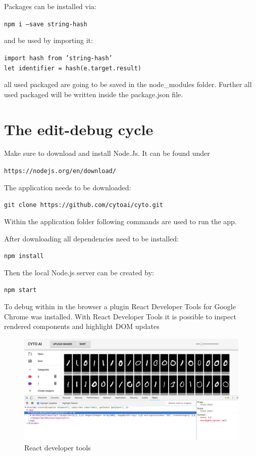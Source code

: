 Packages can be installed via:

	\texttt{npm i ---save string-hash}

and be used by importing it:

	\texttt{import hash from 'string-hash'} \\
	\texttt{let identifier = hash(e.target.result)}

all used packaged are going to be saved in the node\_modules
folder. Further all used packaged will be written inside the
package.json file.


\section{The edit-debug cycle}

Make sure to download and install Node.Js. It can be found under

\texttt{https://nodejs.org/en/download/}

The application needs to be downloaded:

\texttt{git clone https://github.com/cytoai/cyto.git}

Within the application folder following commands are used to
run the app.

After downloading all dependencies need to be installed:

\texttt{npm install}

Then the local Node.js server can be created by:

\texttt{npm start}

To debug within in the browser a plugin React Developer Tools
for Google Chrome was installed. With React Developer Tools
it is possible to inspect rendered components and highlight DOM updates 

\begin{figure}[H]
	\centering
	\includegraphics[width=0.9\linewidth]{bilder/cyto/ReactDebug.png}
	\caption{React developer tools}
	\label{fig:Developer Tools}
\end{figure}

